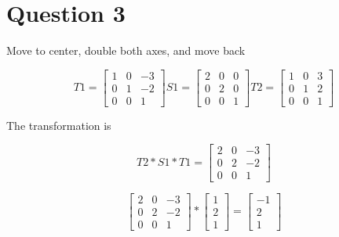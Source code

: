 \documentclass{article}
\begin{document}
	\section{Question 3}
		\begin{center}
			Move to center, double both axes, and move back
		\end{center}
	\[
	T1 = 
	\begin{bmatrix}
	1 & 0 & -3 \\
	0 & 1 & -2 \\
	0 & 0 & 1
	\end{bmatrix}
	S1 = 
	\begin{bmatrix}
	2 & 0 & 0 \\
	0 & 2 & 0 \\
	0 & 0 & 1
	\end{bmatrix}
	T2 = 
	\begin{bmatrix}
	1 & 0 & 3 \\
	0 & 1 & 2 \\
	0 & 0 & 1
	\end{bmatrix}
	\]
	\begin{center}
		The transformation is 
	\end{center}
	\[
	T2 * S1 * T1 = 
	\begin{bmatrix}
	2 & 0 & -3 \\
	0 & 2 & -2 \\
	0 & 0 & 1
	\end{bmatrix}
	\]
	
	\[
	\begin{bmatrix}
	2 & 0 & -3 \\
	0 & 2 & -2 \\
	0 & 0 & 1
	\end{bmatrix}
	*
	\begin{bmatrix}
	1 \\ 
	2 \\
	1 
	\end{bmatrix}
	=
	\begin{bmatrix}
	-1 \\
	2 \\ 
	1 
	\end{bmatrix}
	\]
		
	
\end{document}
